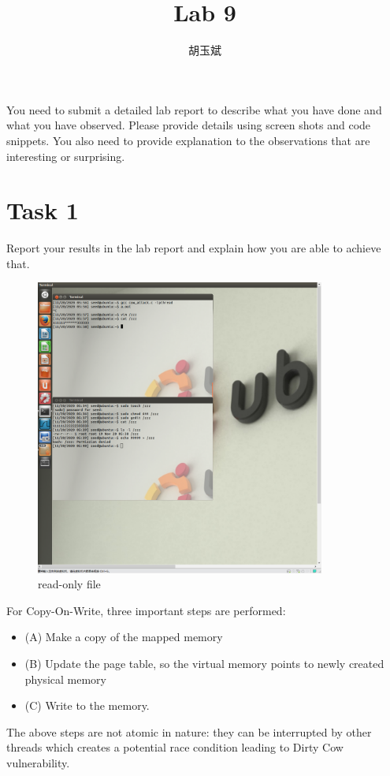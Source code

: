 \documentclass[onecolumn,oneside]{SUSTechHomework}
\author{胡玉斌}
\title{Lab 9}
\begin{document}
  \maketitle

  You need to submit a detailed lab report to describe what you have done and what you have observed. Please provide details using screen shots and code snippets. You also need to provide explanation to the observations that are interesting or surprising.

  \section*{Task 1}

  Report your results in the lab report and explain how you are able to achieve that.

    \begin{figure}[H]
      \centering
      \includegraphics[width=0.85\textwidth]{img/pic1.png}
      \caption{read-only file}
    \end{figure}

    For Copy-On-Write, three important steps are performed:
    \begin{itemize}
      \item (A) Make a copy of the mapped memory
      \item (B) Update the page table, so the virtual memory points to newly created physical memory
      \item (C) Write to the memory.
    \end{itemize}
    The above steps are not atomic in nature: they can be interrupted by other threads which creates a potential race condition leading to Dirty Cow vulnerability.
\end{document}
